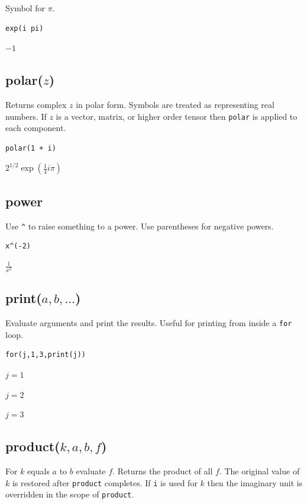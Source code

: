 Symbol for $\pi$.

{\color{blue}
\begin{verbatim}
exp(i pi)
\end{verbatim}
}

$-1$

\subsection*{polar($z$)}

Returns complex $z$ in polar form.
Symbols are treated as representing real numbers.
If $z$ is a vector, matrix, or higher order tensor then
\verb$polar$ is applied to each component.

{\color{blue}
\begin{verbatim}
polar(1 + i)
\end{verbatim}
}

$2^{1/2}\exp\left(\frac{1}{4}i\pi\right)$

\subsection*{power}

Use \verb$^$ to raise something to a power.
Use parentheses for negative powers.

{\color{blue}
\begin{verbatim}
x^(-2)
\end{verbatim}
}

$\displaystyle \frac{1}{x^2}$

\subsection*{print($a,b,\ldots$)}

Evaluate arguments and print the results.
Useful for printing from inside a {\tt for} loop.

{\color{blue}
\begin{verbatim}
for(j,1,3,print(j))
\end{verbatim}
}

$j=1$

$j=2$

$j=3$

\subsection*{product($k,a,b,f$)}

For $k$ equals $a$ to $b$ evaluate $f$.
Returns the product of all $f$.
The original value of $k$ is restored after \verb$product$ completes.
If \verb$i$ is used for $k$ then the imaginary unit is overridden in the scope of \verb$product$.

